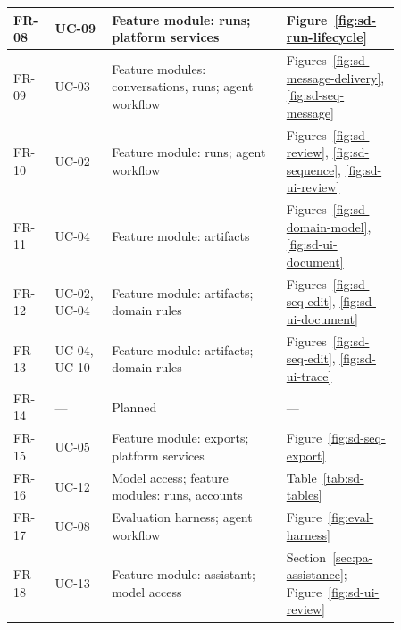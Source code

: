 \begin{longtable}{|p{0.09\linewidth}|p{0.13\linewidth}|p{0.40\linewidth}|p{0.24\linewidth}|}
    FR-08 & UC-09 & Feature module: runs; platform services & Figure~\ref{fig:sd-run-lifecycle} \\ \hline
    FR-09 & UC-03 & Feature modules: conversations, runs; agent workflow & Figures~\ref{fig:sd-message-delivery}, \ref{fig:sd-seq-message} \\ \hline
    FR-10 & UC-02 & Feature module: runs; agent workflow & Figures~\ref{fig:sd-review}, \ref{fig:sd-sequence}, \ref{fig:sd-ui-review} \\ \hline
    FR-11 & UC-04 & Feature module: artifacts & Figures~\ref{fig:sd-domain-model}, \ref{fig:sd-ui-document} \\ \hline
    FR-12 & UC-02, UC-04 & Feature module: artifacts; domain rules & Figures~\ref{fig:sd-seq-edit}, \ref{fig:sd-ui-document} \\ \hline
    FR-13 & UC-04, UC-10 & Feature module: artifacts; domain rules & Figures~\ref{fig:sd-seq-edit}, \ref{fig:sd-ui-trace} \\ \hline
    FR-14 & --- & Planned & --- \\ \hline
    FR-15 & UC-05 & Feature module: exports; platform services & Figure~\ref{fig:sd-seq-export} \\ \hline
    FR-16 & UC-12 & Model access; feature modules: runs, accounts & Table~\ref{tab:sd-tables} \\ \hline
    FR-17 & UC-08 & Evaluation harness; agent workflow & Figure~\ref{fig:eval-harness} \\ \hline
    FR-18 & UC-13 & Feature module: assistant; model access & Section~\ref{sec:pa-assistance}; Figure~\ref{fig:sd-ui-review} \\ \hline
\end{longtable}
\endgroup
